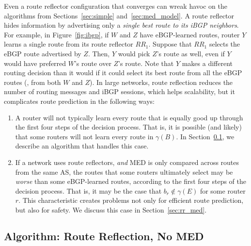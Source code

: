 Even a route reflector configuration that converges can wreak havoc on
the algorithms from Sections~\ref{sec:simple} and~\ref{sec:med_model}.
A route reflector hides information by advertising only a {\em single
best route to its iBGP neighbors}.
For example, in
Figure~\ref{fig:ibgp}, if $W$ and $Z$ have eBGP-learned routes, router
$Y$ learns a single route from its route reflector $RR_1$.  Suppose that
$RR_1$ selects the eBGP route advertised by $Z$.
Then, $Y$ would pick $Z$'s route as well,
even if $Y$ would have preferred $W$'s route over $Z$'s route.  Note
that $Y$ 
makes a different routing decision than it would if it could select
its best route from all the eBGP routes (\ie, from both $W$ and $Z$).
In large networks, route reflection reduces the number of routing
messages and iBGP sessions, which helps scalability, but it complicates
route prediction in the following ways:

\begin{enumerate}
\itemsep=-1pt

\item A router will not typically learn every route that is equally good
  up through the first four steps of the decision process.  That is, it
  is possible (and likely) that some routers will not learn every route
  in $\gamma(B)$.  In Section~\ref{sec:rr_nomed}, we describe an
  algorithm that handles this case.

\item If a network uses route reflectors, {\em and} MED is only
  compared across routes from the same AS, the routes that some routers
  ultimately select may be {\em worse} than some
  eBGP-learned routes, according to the first four steps of the
  decision process.  That is, it may be the case that $b_r \not\in
  \gamma(E)$ for some router $r$.  This characteristic 
  creates problems not only for efficient route prediction, but also for
  safety. 
  We discuss this case in Section~\ref{sec:rr_med}.
\end{enumerate}

\subsection{Algorithm: Route Reflection, No MED}\label{sec:rr_nomed}

